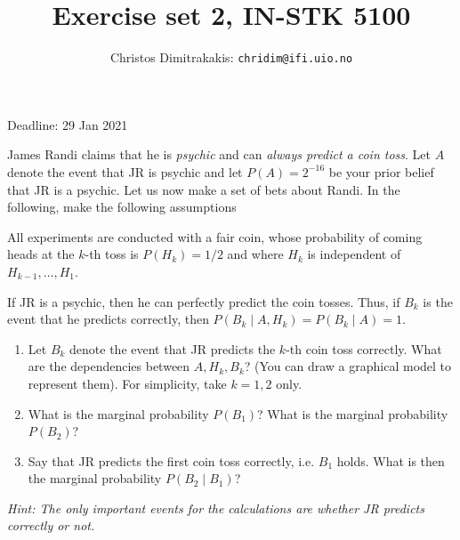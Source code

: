 \documentclass[twoside,a4paper]{article}
\begin{document}
\title{Exercise set 2, IN-STK 5100}
\author{Christos Dimitrakakis: \texttt{chridim@ifi.uio.no}}

\maketitle
\large{Deadline: 29 Jan 2021}

\vspace{1em}

\begin{exercise}
  James Randi claims that he is \emph{psychic} and can \emph{always predict a coin toss}. Let $A$ denote the event that JR is psychic and let $P(A) = 2^{-16}$ be your prior belief that JR is a psychic. Let us now make a set of bets about Randi.
  In the following, make the following assumptions
  \begin{assumption}
    All experiments are conducted with a fair coin, whose probability of coming heads at the $k$-th toss is $P(H_k) = 1/2$ and where $H_k$ is independent of $H_{k-1}, \ldots, H_1$.
  \end{assumption}
  \begin{assumption}
    If JR is a psychic, then he can perfectly predict the coin tosses. Thus, if $B_k$ is the event that he predicts correctly, then $P(B_k \mid A, H_k) = P(B_k \mid A) = 1$.
  \end{assumption}


  
  \begin{enumerate}
  \item Let $B_k$ denote the event that JR predicts the $k$-th coin toss correctly. What are the dependencies between $A, H_k, B_k$? (You can draw a graphical model to represent them). For simplicity, take $k=1, 2$ only.
  \item What is the marginal probability $P(B_1)$? What is the marginal probability $P(B_2)$?  
  \item Say that JR predicts the first coin toss correctly, i.e. $B_1$ holds. What is then the marginal probability $P(B_2 \mid B_1)$? 
  \end{enumerate}
  \emph{Hint: The only important events for the calculations are whether JR predicts correctly or not.}
\end{exercise}
\end{document}
